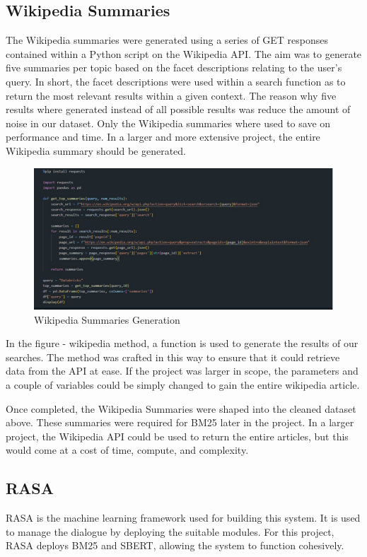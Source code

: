 \documentclass[11pt]{article}
\begin{document}
\subsection{Wikipedia Summaries}
The Wikipedia summaries were generated using a series of GET responses contained within a Python script on the Wikipedia API. The aim was to generate five summaries per topic based on the facet descriptions \textendash{} relating to the user's query. In short, the facet descriptions were used within a search function as to return the most relevant results within a given context. The reason why five results where generated instead of all possible results was reduce the amount of noise in our dataset. Only the Wikipedia summaries where used to save on performance and time. In a larger and more extensive project, the entire Wikipedia summary should be generated. 

\begin{figure}[htbp]
  \centering
  \includegraphics[width=\linewidth]{./img/wiki.png}
  \caption{Wikipedia Summaries Generation}
  \label{fig:wikipedia method}
\end{figure}

In the figure - wikipedia method, a function is used to generate the results of our searches. The method was crafted in this way to ensure that it could retrieve data from the API at ease. If the project was larger in scope, the parameters and a couple of variables could be simply changed to gain the entire wikipedia article. 

Once completed, the Wikipedia Summaries were shaped into the cleaned dataset above. These summaries were required for BM25 later in the project. In a larger project, the Wikipedia API could be used to return the entire articles, but this would come at a cost of time, compute, and complexity.


\subsection{{RASA}}
RASA is the machine learning framework used for building this system. It is used to manage the dialogue by deploying the suitable modules. For this project, RASA deploys BM25 and SBERT, allowing the system to function cohesively. 
\end{document}
